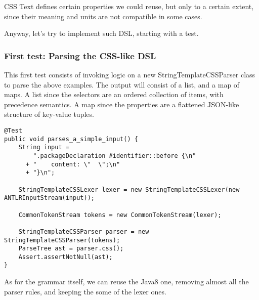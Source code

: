 \documentclass[11pt]{article}
\begin{document}
CSS Text defines certain properties we could reuse, but only to a certain extent, since their meaning and units are
not compatible in some cases.

Anyway, let's try to implement such DSL, starting with a test.

\subsubsection{First test: Parsing the CSS-like DSL}
\label{sec-1-4-2}

This first test consists of invoking logic on a new StringTemplateCSSParser class to parse the above examples. The output
will consist of a list, and a map of maps. A list since the selectors are an ordered collection of items, with precedence semantics.
A map since the properties are a flattened JSON-like structure of key-value tuples.

\begin{verbatim}
@Test
public void parses_a_simple_input() {
    String input =
        ".packageDeclaration #identifier::before {\n"
      + "    content: \"  \";\n"
      + "}\n";

    StringTemplateCSSLexer lexer = new StringTemplateCSSLexer(new ANTLRInputStream(input));

    CommonTokenStream tokens = new CommonTokenStream(lexer);

    StringTemplateCSSParser parser = new StringTemplateCSSParser(tokens);
    ParseTree ast = parser.css();
    Assert.assertNotNull(ast);
}
\end{verbatim}

As for the grammar itself, we can reuse the Java8 one, removing almost all the parser rules, and keeping the some of the lexer
ones.
\end{document}
